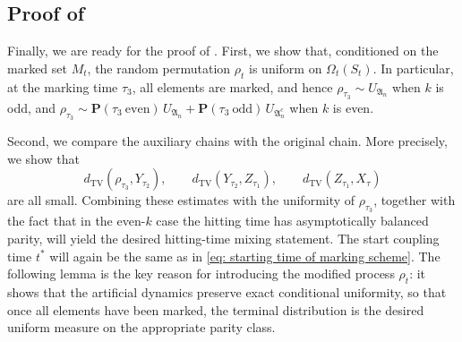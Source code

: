 \subsection{Proof of }
Finally, we are ready for the proof of . First, we show that, conditioned on the marked set \(M_t\), the random permutation \(\rho_t\) is uniform on \(\Omega_t(S_t)\). In particular, at the marking time \(\tau_3\), all elements are marked, and hence \(\rho_{\tau_3}\sim U_{\mathfrak A_n}\) when $k$ is odd, and   \(\rho_{\tau_3}\sim \mathbf{P}(\tau_3 ~\text{even})\,U_{\mathfrak A_n}+\mathbf{P}(\tau_3 ~\text{odd})\,U_{\mathfrak A_n^c}\) when $k$ is even.

Second, we compare the auxiliary chains with the original chain. More precisely, we show that
\[
    d_{\mathrm{TV}}(\rho_{\tau_3},Y_{\tau_2}),\qquad
    d_{\mathrm{TV}}(Y_{\tau_2},Z_{\tau_1}),\qquad
    d_{\mathrm{TV}}(Z_{\tau_1},X_{\tau})
\]
are all small. Combining these estimates with the uniformity of \(\rho_{\tau_3}\), together with the fact that in the even-\(k\) case the hitting time has asymptotically balanced parity, will yield the desired hitting-time mixing statement. The start coupling time $t^*$ will again be the same as in \eqref{eq: starting time of marking scheme}. The following lemma is the key reason for introducing the modified process $\rho_t$: it shows that the artificial dynamics preserve exact conditional uniformity, so that once all elements have been marked, the terminal distribution is the desired uniform measure on the appropriate parity class.

